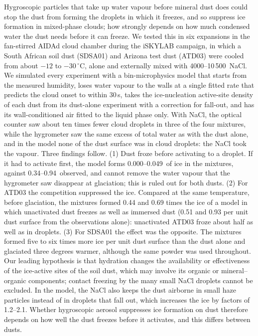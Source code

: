 Hygroscopic particles that take up water vapour before mineral dust does could stop the dust from forming the droplets in which it freezes, and so suppress ice formation in mixed-phase clouds; how strongly depends on how much condensed water the dust needs before it can freeze. We tested this in six expansions in the fan-stirred AIDAd cloud chamber during the iSKYLAB campaign, in which a South African soil dust (SDSA01) and Arizona test dust (ATD03) were cooled from about $-12$ to $-30\,^\circ$C, alone and externally mixed with 4000--10\,500\cmc\ NaCl. We simulated every experiment with a bin-microphysics model that starts from the measured humidity, loses water vapour to the walls at a single fitted rate that predicts the cloud onset to within 30\,s, takes the ice-nucleation active-site density of each dust from its dust-alone experiment with a correction for fall-out, and has its wall-conditioned air fitted to the liquid phase only. With NaCl, the optical counter saw about ten times fewer cloud droplets in three of the four mixtures, while the hygrometer saw the same excess of total water as with the dust alone, and in the model none of the dust surface was in cloud droplets: the NaCl took the vapour. Three findings follow. (1) Dust froze before activating to a droplet. If it had to activate first, the model forms 0.000--0.049\cmc\ of ice in the mixtures, against 0.34--0.94\cmc\ observed, and cannot remove the water vapour that the hygrometer saw disappear at glaciation; this is ruled out for both dusts. (2) For ATD03 the competition suppressed the ice. Compared at the same temperature, before glaciation, the mixtures formed 0.44 and 0.69 times the ice of a model in which unactivated dust freezes as well as immersed dust (0.51 and 0.93 per unit dust surface from the observations alone): unactivated ATD03 froze about half as well as in droplets. (3) For SDSA01 the effect was the opposite. The mixtures formed five to six times more ice per unit dust surface than the dust alone and glaciated three degrees warmer, although the same powder was used throughout. Our leading hypothesis is that hydration changes the availability or effectiveness of the ice-active sites of the soil dust, which may involve its organic or mineral--organic components; contact freezing by the many small NaCl droplets cannot be excluded. In the model, the NaCl also keeps the dust airborne in small haze particles instead of in droplets that fall out, which increases the ice by factors of 1.2--2.1. Whether hygroscopic aerosol suppresses ice formation on dust therefore depends on how well the dust freezes before it activates, and this differs between dusts.